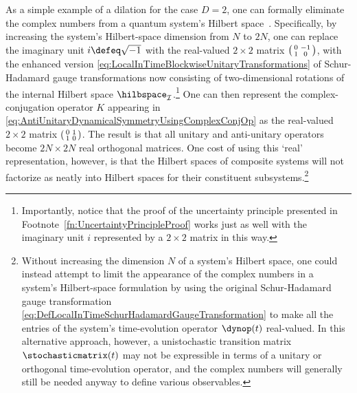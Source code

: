 \documentclass[12pt,english,prl,superscriptaddress,nobibnotes,nofootinbib]{revtex4-2}
\let\originalleft\left
\let\originalright\right
\renewcommand{\left}{\mathopen{}\mathclose\bgroup\originalleft}
\renewcommand{\right}{\aftergroup\egroup\originalright}
\begin{document}
As a simple example of a dilation for the case $D=2$, one can formally
eliminate the complex numbers from a quantum system's Hilbert space~\citep{Myrheim:1999qmoarhs}.
Specifically, by increasing the system's Hilbert-space dimension from
$N$ to $2N$, one can replace the imaginary unit $i\defeq\sqrt{-1}$
with the real-valued $2\times2$ matrix $\left(\begin{smallmatrix}0 & -1\\
1 & 0
\end{smallmatrix}\right)$, with the enhanced version \eqref{eq:LocalInTimeBlockwiseUnitaryTransformations}
of Schur-Hadamard gauge transformations now consisting of two-dimensional
rotations of the internal Hilbert space $\hilbspace_{\mathcal{I}}$.\footnote{Importantly, notice that the proof of the uncertainty principle presented
in Footnote~\ref{fn:UncertaintyPrincipleProof} works just as well
with the imaginary unit $i$ represented by a $2\times2$ matrix in
this way.} One can then represent the complex-conjugation operator $K$ appearing
in \eqref{eq:AntiUnitaryDynamicalSymmetryUsingComplexConjOp} as the
real-valued $2\times2$ matrix $\left(\begin{smallmatrix}0 & 1\\
1 & 0
\end{smallmatrix}\right)$. The result is that all unitary and anti-unitary operators become
$2N\times2N$ real orthogonal matrices. One cost of using this \textquoteleft real\textquoteright{}
representation, however, is that the Hilbert spaces of composite systems
will not factorize as neatly into Hilbert spaces for their constituent
subsystems.\footnote{Without increasing the dimension $N$ of a system's Hilbert space,
one could instead attempt to limit the appearance of the complex numbers
in a system's Hilbert-space formulation by using the original Schur-Hadamard
gauge transformation \eqref{eq:DefLocalInTimeSchurHadamardGaugeTransformation}
to make all the entries of the system's time-evolution operator $\dynop\left(t\right)$
real-valued. In this alternative approach, however, a unistochastic
transition matrix $\stochasticmatrix\left(t\right)$ may not be expressible
in terms of a unitary or orthogonal time-evolution operator, and the
complex numbers will generally still be needed anyway to define various
observables.}
\end{document}
